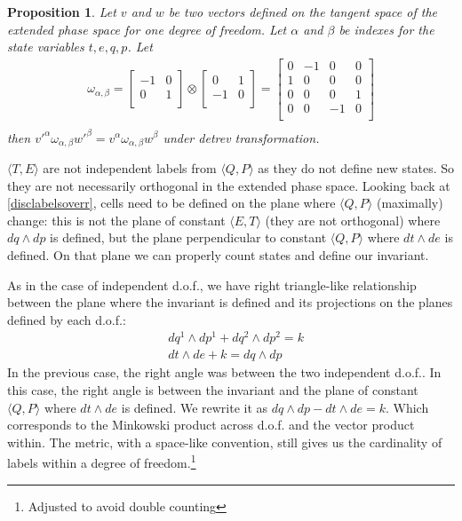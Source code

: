 \documentclass[twocolumn,floatfix,nofootinbib]{revtex4}   %
\theoremstyle{theorem}
\newtheorem{prop}[thm]{Proposition}
\theoremstyle{definition}
\begin{document}
\begin{prop}\label{tdofInvariant}
Let $v$ and $w$ be two vectors defined on the tangent space of the extended phase space for one degree of freedom. Let $\alpha$ and $\beta$ be indexes for the state variables $t, e, q, p$. Let
\begin{align*}
\omega_{\alpha, \beta} =  \left[
  \begin{array}{cc}
    -1 & 0 \\
    0 & 1 \\
  \end{array}
\right] \otimes \left[
  \begin{array}{cc}
    0 & 1 \\
    -1 & 0 \\
  \end{array}
\right]
= \left[
  \begin{array}{cccc}
    0 & -1 & 0 & 0 \\
    1 & 0 & 0 & 0 \\
    0 & 0 & 0 & 1 \\
    0 & 0 & -1 & 0 \\
  \end{array}
\right] \\
\end{align*}
then $v'^{\alpha} \omega_{\alpha, \beta} w'^{\beta}=v^{\alpha} \omega_{\alpha, \beta} w^{\beta}$ under detrev transformation.
\end{prop}

$\langle T, E \rangle$ are not independent labels from $\langle Q, P \rangle$ as they do not define new states. So they are not necessarily orthogonal in the extended phase space. Looking back at \ref{disclabelsoverr}, cells need to be defined on the plane where $\langle Q, P \rangle$ (maximally) change: this is not the plane of constant $\langle E, T \rangle$ (they are not orthogonal) where $dq \wedge dp$ is defined, but the plane perpendicular to constant $\langle Q, P \rangle$ where $dt \wedge de$ is defined. On that plane we can properly count states and define our invariant.

As in the case of independent d.o.f., we have right triangle-like relationship between the plane where the invariant is defined and its projections on the planes defined by each d.o.f.:
\begin{align*}
&dq^1 \wedge dp^1 + dq^2 \wedge dp^2 = k \\
&dt \wedge de + k = dq \wedge dp
\end{align*}
In the previous case, the right angle was between the two independent d.o.f.. In this case, the right angle is between the invariant and the plane of constant $\langle Q, P \rangle$ where $dt \wedge de$ is defined. We rewrite it as $dq \wedge dp - dt \wedge de = k$. Which corresponds to the Minkowski product across d.o.f. and the vector product within. The metric, with a space-like convention, still gives us the cardinality of labels within a degree of freedom.\footnote{Adjusted to avoid double counting}
\end{document}

